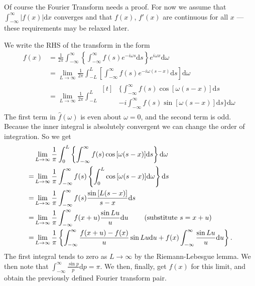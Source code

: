 \documentclass[12pt]{report}
\theoremstyle{definition}
\begin{document}
Of course the Fourier Transform needs a proof.
For now we assume that $\int_{-\infty}^{\infty} |f(x)|\mathrm{d}x$
converges and that $f(x)$, $f'(x)$ are continuous for all $x$
--- these requirements may be relaxed later.

We write the RHS of the transform in the form\[
    \begin{align*}
        f(x)
        & = \frac{1}{2\pi}\int_{-\infty}^{\infty} \left\{
        \int_{-\infty}^{\infty} f(s)e^{-i\omega s}\mathrm{d}s\right\}e^{i\omega x}\mathrm{d}\omega \\
        & = \lim_{L\rightarrow{}\infty}\frac{1}{2\pi}\int_{-L}^{L} \left[
        \int_{-\infty}^{\infty} f(s)e^{-i\omega (s-x)}\mathrm{d}s\right] \mathrm{d}\omega \\
        & = \lim_{L\rightarrow{}\infty} \frac{1}{2\pi}\int_{-L}^{L}
        \begin{aligned}[t]
        & \bigg\{\int_{-\infty}^{\infty} f(s)\cos{[\omega(s-x)]}\mathrm{d}s \\
        & - i \int_{-\infty}^{\infty} f(s)\sin{[\omega(s-x)]}\mathrm{d}s\bigg\}\mathrm{d}\omega
        \end{aligned}
    \end{align*}
\]
The first term in $\hat{f}(\omega)$ is even about $\omega = 0$,
and the second term is odd.
Because the inner integral is absolutely convergent
we can change the order of integration.
So we get\[
    \begin{align*}
        & \lim_{L\rightarrow{}\infty}\frac{1}{\pi}\int_{0}^{L} \left\{
        \int_{-\infty}^{\infty} f(s)\cos{[\omega(s-x)]}\mathrm{d}s\right\}\mathrm{d}\omega \\
        = & \lim_{L\rightarrow{}\infty} \frac{1}{\pi}\int_{-\infty}^{\infty} f(s)\left\{
        \int_{0}^{L} \cos{[\omega(s-x)]}\mathrm{d}\omega\right\}\mathrm{d}s \\
            = & \lim_{L\rightarrow{}\infty}\frac{1}{\pi}\int_{-\infty}^{\infty}
            f(s) \frac{\sin{[L(s-x)]}}{s-x}\mathrm{d}s \\
            = & \lim_{L\rightarrow{}\infty}\frac{1}{\pi}\int_{-\infty}^{\infty} f(x+u)
            \frac{\sin{Lu}}{u}\mathrm{d}u \qquad\;\textnormal{(substitute $s=x+u$)}\; \\
            = & \lim_{L\rightarrow{}\infty}\frac{1}{\pi}\left\{
            \int_{-\infty}^{\infty} \frac{f(x+u)-f(x)}{u}\sin{Lu}\mathrm{d}u
        + f(x)\int_{-\infty}^{\infty} \frac{\sin{Lu}}{u}\mathrm{d}u\right\}.
    \end{align*}
\]
The first integral tends to zero as $L\rightarrow{}\infty$
by the Riemann-Lebesgue lemma.
We then note that $\int_{-\infty}^{\infty} \frac{\sin{p}}{p}\mathrm{d}p = \pi$.
We then, finally, get $f(x)$ for this limit,
and obtain the previously defined Fourier transform pair.
\end{document}
